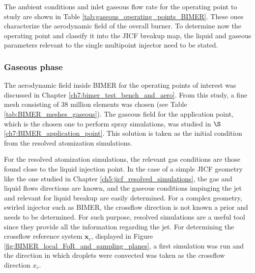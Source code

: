The ambient conditions and inlet gaseous flow rate for the operating point to study are shown in Table \ref{tab:gaseous_operating_points_BIMER}. These ones characterize the aerodynamic field of the overall burner. To determine now the operating point and classify it into the JICF breakup map, the liquid and gaseous parameters relevant to the single multipoint injector need to be stated.


\subsubsection*{Gaseous phase}



The aerodynamic field inside BIMER for the operating points of interest was discussed in Chapter \ref{ch7:bimer_test_bench_and_aero}. From this study, a fine mesh consisting of 38 million elements was chosen (see Table \ref{tab:BIMER_meshes_gaseous}). The gaseous field for the application point, which is the chosen one to perform spray simulations, was studied in $\S$\ref{ch7:BIMER_application_point}. This solution is taken as the initial condition from the resolved atomization simulations.

For the resolved atomization simulations, the relevant gas conditions are those found close to the liquid injection point. In the case of a simple JICF geometry like the one studied in Chapter \ref{ch5:jicf_resolved_simulations}, the gas and liquid flows directions are known, and the gaseous conditions impinging the jet and relevant for liquid breakup are easily determined. For a complex geometry, swirled injector such as BIMER, the crossflow direction is not known a prior and needs to be determined. For such purpose, resolved simulations are a useful tool since they provide all the information regarding the jet. For determining the crossflow reference system $\textbf{x}_c$, displayed in Figure \ref{fig:BIMER_local_FoR_and_sampling_planes},  a first simulation was run and the direction in which droplets were convected was taken as the crossflow direction $x_c$. 

